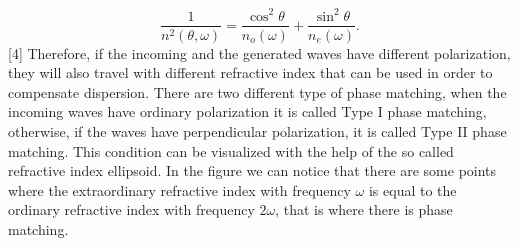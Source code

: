 \documentclass[a4paper,10pt]{article}
\begin{document}
\[\frac{1}{n^2(\theta,\omega)} = \frac{\cos^2\theta}{n_o(\omega)}+\frac{\sin^2\theta}{n_e(\omega)}.\]
[4]
Therefore, if the incoming and the generated waves have different polarization, they will also travel with different refractive index that can be used in order to compensate dispersion.
There are two different type of phase matching, when the incoming waves have ordinary polarization it is called Type I phase matching, otherwise, if the waves have perpendicular polarization, it is called Type II phase matching. This condition can be visualized with the help of the so called refractive index ellipsoid. In the figure we can notice that there are some points where the extraordinary refractive index with frequency $\omega$ is equal to the ordinary refractive index with frequency $2\omega$, that is where there is phase matching.
\end{document}
